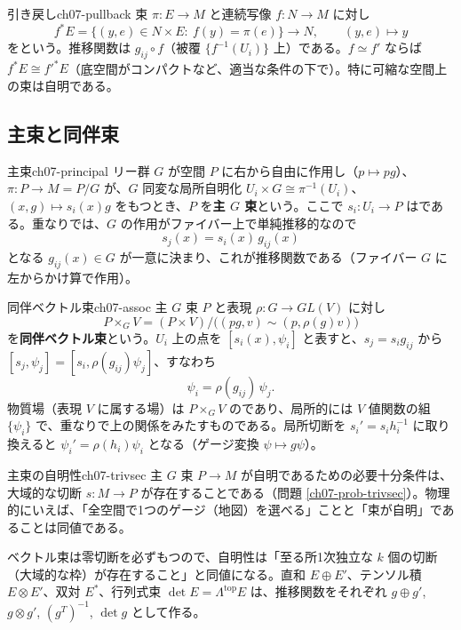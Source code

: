 \begin{mydef}{引き戻し}{ch07-pullback}
束 $\pi\colon E\to M$ と連続写像 $f\colon N\to M$ に対し
\[
f^*E=\{(y,e)\in N\times E:\ f(y)=\pi(e)\}\longrightarrow N,\qquad (y,e)\mapsto y
\]
をという。推移関数は $g_{ij}\circ f$（被覆 $\{f^{-1}(U_i)\}$ 上）である。$f\simeq f'$ ならば $f^*E\cong f'^*E$（底空間がコンパクトなど、適当な条件の下で）。特に可縮な空間上の束は自明である。
\end{mydef}

\subsection{主束と同伴束}

\begin{mydef}{主束}{ch07-principal}
リー群 $G$ が空間 $P$ に右から自由に作用し（$p\mapsto pg$）、$\pi\colon P\to M=P/G$ が、$G$ 同変な局所自明化 $U_i\times G\cong\pi^{-1}(U_i)$、$(x,g)\mapsto s_i(x)g$ をもつとき、$P$ を\textbf{主 $G$ 束}という。ここで $s_i\colon U_i\to P$ はである。重なりでは、$G$ の作用がファイバー上で単純推移的なので
\[
s_j(x)=s_i(x)\,g_{ij}(x)
\]
となる $g_{ij}(x)\in G$ が一意に決まり、これが推移関数である（ファイバー $G$ に左からかけ算で作用）。
\end{mydef}

\begin{mydef}{同伴ベクトル束}{ch07-assoc}
主 $G$ 束 $P$ と表現 $\rho\colon G\to GL(V)$ に対し
\[
P\times_GV=(P\times V)/\bigl((pg,v)\sim(p,\rho(g)v)\bigr)
\]
を\textbf{同伴ベクトル束}という。$U_i$ 上の点を $[s_i(x),\psi_i]$ と表すと、$s_j=s_ig_{ij}$ から $[s_j,\psi_j]=[s_i,\rho(g_{ij})\psi_j]$、すなわち
\[
\psi_i=\rho(g_{ij})\,\psi_j .
\]
物質場（表現 $V$ に属する場）は $P\times_GV$ のであり、局所的には $V$ 値関数の組 $\{\psi_i\}$ で、重なりで上の関係をみたすものである。局所切断を $s_i'=s_ih_i^{-1}$ に取り換えると $\psi_i'=\rho(h_i)\psi_i$ となる（ゲージ変換 $\psi\mapsto g\psi$）。
\end{mydef}

\begin{mythm}{主束の自明性}{ch07-trivsec}
主 $G$ 束 $P\to M$ が自明であるための必要十分条件は、大域的な切断 $s\colon M\to P$ が存在することである（問題 \ref{ch07-prob-trivsec}）。物理的にいえば、「全空間で1つのゲージ（地図）を選べる」ことと「束が自明」であることは同値である。
\end{mythm}

ベクトル束は零切断を必ずもつので、自明性は「至る所1次独立な $k$ 個の切断（大域的な枠）が存在すること」と同値になる。直和 $E\oplus E'$、テンソル積 $E\otimes E'$、双対 $E^*$、行列式束 $\det E=\Lambda^{\mathrm{top}}E$ は、推移関数をそれぞれ $g\oplus g'$, $g\otimes g'$, $(g^{T})^{-1}$, $\det g$ として作る。

